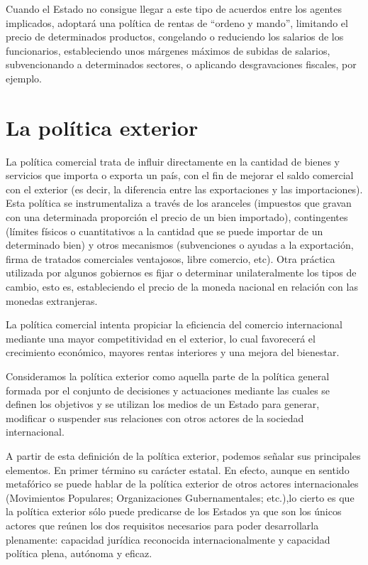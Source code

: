 \documentclass[
]{krantz}
\begin{document}
Cuando el Estado no consigue llegar a este tipo de acuerdos entre los agentes implicados, adoptará una política de rentas de ``ordeno y mando'', limitando el precio de determinados productos, congelando o reduciendo los salarios de los funcionarios, estableciendo unos márgenes máximos de subidas de salarios, subvencionando a determinados sectores, o aplicando desgravaciones fiscales, por ejemplo.

\hypertarget{la-poluxedtica-exterior}{%
\section{La política exterior}\label{la-poluxedtica-exterior}}

La política comercial trata de influir directamente en la cantidad de bienes y servicios que importa o exporta un país, con el fin de mejorar el saldo comercial con el exterior (es decir, la diferencia entre las exportaciones y las importaciones). Esta política se instrumentaliza a través de los aranceles (impuestos que gravan con una determinada proporción el precio de un bien importado), contingentes (límites físicos o cuantitativos a la cantidad que se puede importar de un determinado bien) y otros mecanismos (subvenciones o ayudas a la exportación, firma de tratados comerciales ventajosos, libre comercio, etc). Otra práctica utilizada por algunos gobiernos es fijar o determinar unilateralmente los tipos de cambio, esto es, estableciendo el precio de la moneda nacional en relación con las monedas extranjeras.

La política comercial intenta propiciar la eficiencia del comercio internacional mediante una mayor competitividad en el exterior, lo cual favorecerá el crecimiento económico, mayores rentas interiores y una mejora del bienestar.

Consideramos la política exterior como aquella parte de la política general formada por el conjunto de decisiones y actuaciones mediante las cuales se definen los objetivos y se utilizan los medios de un Estado para generar, modificar o suspender sus relaciones con otros actores de la sociedad internacional.

A partir de esta definición de la política exterior, podemos señalar sus principales elementos. En primer término su carácter estatal. En efecto, aunque en sentido metafórico se puede hablar de la política exterior de otros actores internacionales (Movimientos Populares; Organizaciones Gubernamentales; etc.),lo cierto es que la política exterior sólo puede predicarse de los Estados ya que son los únicos actores que reúnen los dos requisitos necesarios para poder desarrollarla plenamente: capacidad jurídica reconocida internacionalmente y capacidad política plena, autónoma y eficaz.
\end{document}
